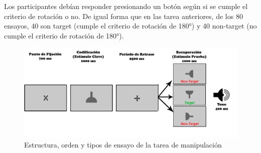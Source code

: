 \documentclass[12pt,letterpaper,final]{article}
\begin{document}
Los participantes debían responder presionando un botón según si se cumple el criterio de rotación o no.
De igual forma que en las tarea anteriores, de los 80 ensayos, 40 son target (cumple el criterio de rotación de \ang{180}) y 40 non-target (no cumple el criterio de rotación de  \ang{180}). %

\begin{figure}[h!]
	\centering
	\includegraphics[scale=0.09]{str-mp.png}
	\caption{Estructura, orden y tipos de ensayo de la tarea de manipulación}
	\label{fig:str-mp}
\end{figure}
\end{document}
